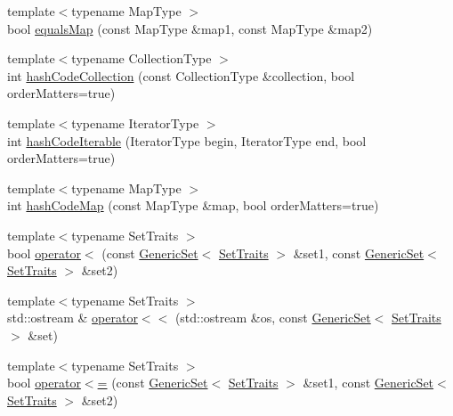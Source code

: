 \begin{DoxyCompactItemize}
\item 
{\footnotesize template$<$typename Map\+Type $>$ }\\bool \mbox{\hyperlink{namespacestanfordcpplib_1_1collections_af183b0e3f1ca38661646f2a5ba389090}{equals\+Map}} (const Map\+Type \&map1, const Map\+Type \&map2)
\item 
{\footnotesize template$<$typename Collection\+Type $>$ }\\int \mbox{\hyperlink{namespacestanfordcpplib_1_1collections_a4bde4f51efc44d308c1c5f34a3ce68f0}{hash\+Code\+Collection}} (const Collection\+Type \&collection, bool order\+Matters=true)
\item 
{\footnotesize template$<$typename Iterator\+Type $>$ }\\int \mbox{\hyperlink{namespacestanfordcpplib_1_1collections_ab25ff6237487d8f8de80deac63917870}{hash\+Code\+Iterable}} (Iterator\+Type begin, Iterator\+Type end, bool order\+Matters=true)
\item 
{\footnotesize template$<$typename Map\+Type $>$ }\\int \mbox{\hyperlink{namespacestanfordcpplib_1_1collections_aac709e6defed173090838d4115bdfcc5}{hash\+Code\+Map}} (const Map\+Type \&map, bool order\+Matters=true)
\item 
{\footnotesize template$<$typename Set\+Traits $>$ }\\bool \mbox{\hyperlink{namespacestanfordcpplib_1_1collections_aa3ea03887fa8c5a8c9e91a68907bf625}{operator$<$}} (const \mbox{\hyperlink{classstanfordcpplib_1_1collections_1_1GenericSet}{Generic\+Set}}$<$ \mbox{\hyperlink{structstanfordcpplib_1_1collections_1_1SetTraits}{Set\+Traits}} $>$ \&set1, const \mbox{\hyperlink{classstanfordcpplib_1_1collections_1_1GenericSet}{Generic\+Set}}$<$ \mbox{\hyperlink{structstanfordcpplib_1_1collections_1_1SetTraits}{Set\+Traits}} $>$ \&set2)
\item 
{\footnotesize template$<$typename Set\+Traits $>$ }\\std\+::ostream \& \mbox{\hyperlink{namespacestanfordcpplib_1_1collections_aff90d5798e037c8e932e2dce26e6983a}{operator$<$$<$}} (std\+::ostream \&os, const \mbox{\hyperlink{classstanfordcpplib_1_1collections_1_1GenericSet}{Generic\+Set}}$<$ \mbox{\hyperlink{structstanfordcpplib_1_1collections_1_1SetTraits}{Set\+Traits}} $>$ \&set)
\item 
{\footnotesize template$<$typename Set\+Traits $>$ }\\bool \mbox{\hyperlink{namespacestanfordcpplib_1_1collections_a90953b7174c06404b549bb12c3945df3}{operator$<$=}} (const \mbox{\hyperlink{classstanfordcpplib_1_1collections_1_1GenericSet}{Generic\+Set}}$<$ \mbox{\hyperlink{structstanfordcpplib_1_1collections_1_1SetTraits}{Set\+Traits}} $>$ \&set1, const \mbox{\hyperlink{classstanfordcpplib_1_1collections_1_1GenericSet}{Generic\+Set}}$<$ \mbox{\hyperlink{structstanfordcpplib_1_1collections_1_1SetTraits}{Set\+Traits}} $>$ \&set2)

\end{DoxyCompactItemize}
